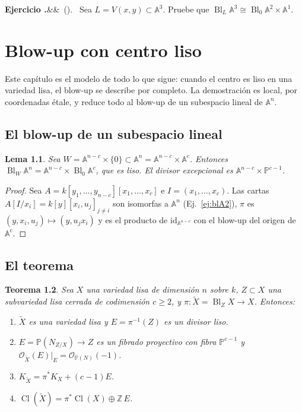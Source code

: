 \documentclass[11pt,a4paper,oneside]{book}
\newcommand{\Bl}{\operatorname{Bl}}
\newcommand{\Cl}{\operatorname{Cl}}
\newcommand{\A}{\mathbb{A}}
\newcommand{\PP}{\mathbb{P}}
\newcommand{\ZZ}{\mathbb{Z}}
\newcommand{\cO}{\mathcal{O}}
\theoremstyle{plain}
\newtheorem{teorema}{Teorema}[chapter]
\newtheorem{lema}[teorema]{Lema}
\theoremstyle{definition}
\theoremstyle{remark}
\newcounter{ejer}[chapter]
\renewcommand{\theejer}{\thechapter.\arabic{ejer}}
\newenvironment{ejercicio}[1][]{\refstepcounter{ejer}\par\medskip\noindent\textbf{Ejercicio \theejer}\ifx&#1&\else\ (#1)\fi.\ }{\par}
\begin{document}
\begin{ejercicio}\label{ej:blow-recta-p3}
Sea $L=V(x,y)\subset\A^3$. Pruebe que $\Bl_L\A^3\cong\Bl_0\A^2\times\A^1$.
\end{ejercicio}

\chapter{Blow-up con centro liso}\label{cap:liso}

Este capítulo es el modelo de todo lo que sigue: cuando el centro es liso en una variedad lisa, el blow-up se describe por completo. La demostración es local, por coordenadas étale, y reduce todo al blow-up de un subespacio lineal de $\A^n$.

\section{El blow-up de un subespacio lineal}

\begin{lema}\label{lema:lineal}
Sea $W=\A^{n-c}\times\{0\}\subset\A^n=\A^{n-c}\times\A^c$. Entonces $\Bl_W\A^n=\A^{n-c}\times\Bl_0\A^c$, que es liso. El divisor excepcional es $\A^{n-c}\times\PP^{c-1}$.
\end{lema}

\begin{proof}
Sea $A=k[y_1,\dots,y_{n-c}][x_1,\dots,x_c]$ e $I=(x_1,\dots,x_c)$. Las cartas $A[I/x_i]=k[y][x_i,u_j]_{j\ne i}$ son isomorfas a $\A^n$ (Ej.~\ref{ej:blA2}), $\pi$ es $(y,x_i,u_j)\mapsto(y,u_jx_i)$ y es el producto de $\mathrm{id}_{\A^{n-c}}$ con el blow-up del origen de $\A^c$.
\end{proof}

\section{El teorema}

\begin{teorema}\label{teo:liso}
Sea $X$ una variedad lisa de dimensión $n$ sobre $k$, $Z\subset X$ una subvariedad lisa cerrada de codimensión $c\ge2$, y $\pi:\tilde X=\Bl_ZX\to X$. Entonces:
\begin{enumerate}[label=(\alph*)]
\item $\tilde X$ es una variedad lisa y $E=\pi^{-1}(Z)$ es un divisor liso.
\item $E=\PP(N_{Z/X})\to Z$ es un fibrado proyectivo con fibra $\PP^{c-1}$ y $\cO_{\tilde X}(E)|_E=\cO_{\PP(N)}(-1)$.
\item $K_{\tilde X}=\pi^*K_X+(c-1)E$.
\item $\Cl(\tilde X)=\pi^*\Cl(X)\oplus\ZZ\,E$.
\end{enumerate}
\end{teorema}
\end{document}
